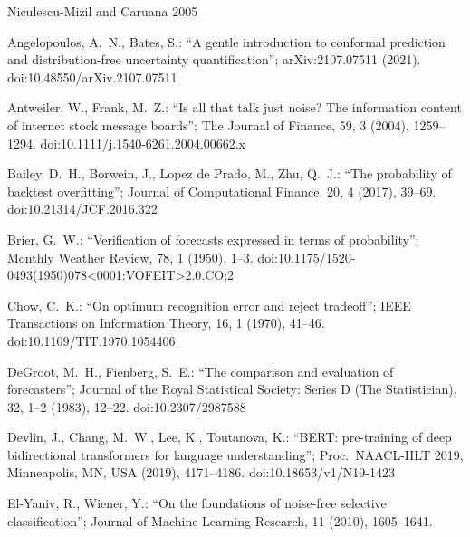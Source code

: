 \documentclass[10pt,a4paper,oneside]{article}
\theoremstyle{definition}
\theoremstyle{plain}
\begin{document}
{\fontsize{9}{11}\selectfont
\begin{thebibliography}{Niculescu-Mizil and Caruana 2005}
\setlength{\itemsep}{1pt}

Angelopoulos, A.\ N., Bates, S.: ``A gentle introduction to conformal prediction and
distribution-free uncertainty quantification''; arXiv:2107.07511 (2021).
doi:10.48550/arXiv.2107.07511

Antweiler, W., Frank, M.\ Z.: ``Is all that talk just noise? The information content of
internet stock message boards''; The Journal of Finance, 59, 3 (2004), 1259--1294.
doi:10.1111/j.1540-6261.2004.00662.x

Bailey, D.\ H., Borwein, J., Lopez de Prado, M., Zhu, Q.\ J.: ``The probability of
backtest overfitting''; Journal of Computational Finance, 20, 4 (2017), 39--69.
doi:10.21314/JCF.2016.322

Brier, G.\ W.: ``Verification of forecasts expressed in terms of probability''; Monthly
Weather Review, 78, 1 (1950), 1--3.
doi:10.1175/1520-0493(1950)078<0001:VOFEIT>2.0.CO;2

Chow, C.\ K.: ``On optimum recognition error and reject tradeoff''; IEEE Transactions
on Information Theory, 16, 1 (1970), 41--46. doi:10.1109/TIT.1970.1054406

DeGroot, M.\ H., Fienberg, S.\ E.: ``The comparison and evaluation of forecasters'';
Journal of the Royal Statistical Society: Series D (The Statistician), 32, 1--2 (1983),
12--22. doi:10.2307/2987588

Devlin, J., Chang, M.\ W., Lee, K., Toutanova, K.: ``BERT: pre-training of deep
bidirectional transformers for language understanding''; Proc.\ NAACL-HLT 2019,
Minneapolis, MN, USA (2019), 4171--4186. doi:10.18653/v1/N19-1423

El-Yaniv, R., Wiener, Y.: ``On the foundations of noise-free selective
classification''; Journal of Machine Learning Research, 11 (2010), 1605--1641.


\end{thebibliography}}
\end{document}

